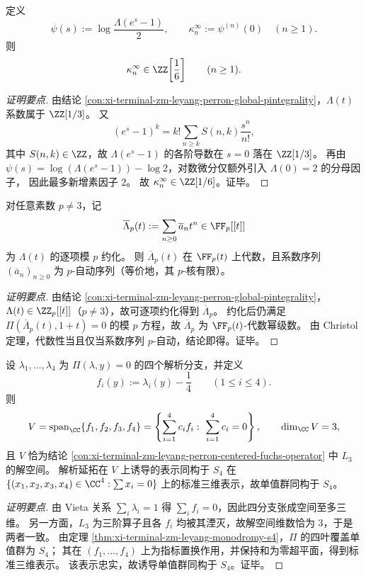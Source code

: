 \begin{conclusion}\label{con:xi-terminal-zm-leyang-perron-cumulant-denominator-2-3}
定义
\[
\psi(s):=\log\frac{\Lambda(e^s-1)}{2},\qquad
\kappa_n^\infty:=\psi^{(n)}(0)\quad(n\ge 1).
\]
则
\[
\kappa_n^\infty\in\ZZ\!\left[\frac16\right]\qquad(n\ge 1).
\]
\end{conclusion}
\begin{proof}[证明要点]
由结论 \ref{con:xi-terminal-zm-leyang-perron-global-pintegrality}，\(\Lambda(t)\) 系数属于 \(\ZZ[1/3]\)。
又
\[
(e^s-1)^k
=
k!\sum_{n\ge k}S(n,k)\frac{s^n}{n!},
\]
其中 \(S(n,k)\in\ZZ\)，故 \(\Lambda(e^s-1)\) 的各阶导数在 \(s=0\) 落在 \(\ZZ[1/3]\)。
再由 \(\psi(s)=\log(\Lambda(e^s-1))-\log 2\)，对数微分仅额外引入 \(\Lambda(0)=2\) 的分母因子，
因此最多新增素因子 \(2\)。
故 \(\kappa_n^\infty\in\ZZ[1/6]\)。证毕。
\end{proof}

\begin{conclusion}[\texorpdfstring{$p\neq 3$}{p!=3} 下的模 \(p\) 自动性与有限 \(p\)-核]\label{con:xi-terminal-zm-leyang-perron-modp-automaticity}
对任意素数 \(p\neq 3\)，记
\[
\overline{\Lambda}_p(t):=\sum_{n\ge 0}\overline{a}_n t^n\in\FF_p[[t]]
\]
为 \(\Lambda(t)\) 的逐项模 \(p\) 约化。
则 \(\overline{\Lambda}_p(t)\) 在 \(\FF_p(t)\) 上代数，且系数序列 \((\overline{a}_n)_{n\ge 0}\) 为 \(p\)-自动序列（等价地，其 \(p\)-核有限）。
\end{conclusion}
\begin{proof}[证明要点]
由结论 \ref{con:xi-terminal-zm-leyang-perron-global-pintegrality}，\(\Lambda(t)\in\ZZ_p[[t]]\)（\(p\neq 3\)），故可逐项约化得到 \(\overline{\Lambda}_p\)。
约化后仍满足
\(
\Pi(\overline{\Lambda}_p(t),1+t)=0
\)
的模 \(p\) 方程，故 \(\overline{\Lambda}_p\) 为 \(\FF_p(t)\)-代数幂级数。
由 Christol 定理，代数性当且仅当系数序列 \(p\)-自动，结论即得。证毕。
\end{proof}

\begin{conclusion}\label{con:xi-terminal-zm-leyang-perron-fuchs-monodromy-s4}
设 \(\lambda_1,\dots,\lambda_4\) 为 \(\Pi(\lambda,y)=0\) 的四个解析分支，并定义
\[
f_i(y):=\lambda_i(y)-\frac14\qquad(1\le i\le 4).
\]
则
\[
V=\mathrm{span}_{\CC}\{f_1,f_2,f_3,f_4\}
=
\left\{\sum_{i=1}^4 c_i f_i:\ \sum_{i=1}^4 c_i=0\right\},
\qquad \dim_{\CC}V=3,
\]
且 \(V\) 恰为结论 \ref{con:xi-terminal-zm-leyang-perron-centered-fuchs-operator} 中 \(L_3\) 的解空间。
解析延拓在 \(V\) 上诱导的表示同构于 \(S_4\) 在
\(
\{(x_1,x_2,x_3,x_4)\in\CC^4:\sum x_i=0\}
\)
上的标准三维表示，故单值群同构于 \(S_4\)。
\end{conclusion}
\begin{proof}[证明要点]
由 Vieta 关系 \(\sum_i\lambda_i=1\) 得 \(\sum_i f_i=0\)，因此四分支张成空间至多三维。
另一方面，\(L_3\) 为三阶算子且各 \(f_i\) 均被其湮灭，故解空间维数恰为 \(3\)，于是两者一致。
由定理 \ref{thm:xi-terminal-zm-leyang-monodromy-s4}，\(\Pi\) 的四叶覆盖单值群为 \(S_4\)；
其在 \((f_1,\dots,f_4)\) 上为指标置换作用，并保持和为零超平面，得到标准三维表示。
该表示忠实，故诱导单值群同构于 \(S_4\)。证毕。
\end{proof}

